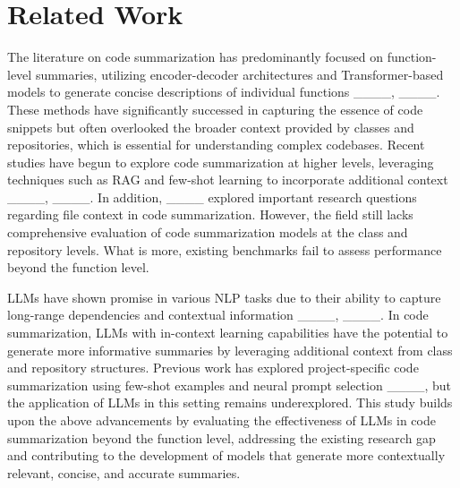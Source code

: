 \section{Related Work}
\vspace*{-1mm}

The literature on code summarization has predominantly focused on function-level summaries, utilizing encoder-decoder architectures and Transformer-based models to generate concise descriptions of individual functions ____, ____. These methods have significantly successed in capturing the essence of code snippets but often overlooked the broader context provided by classes and repositories, which is essential for understanding complex codebases. Recent studies have begun to explore code summarization at higher levels, leveraging techniques such as RAG and few-shot learning to incorporate additional context ____, ____. In addition, ____ explored important research questions regarding file context in code summarization. However, the field still lacks comprehensive evaluation of code summarization models at the class and repository levels. What is more, existing benchmarks fail to assess performance beyond the function level.

LLMs have shown promise in various NLP tasks due to their ability to capture long-range dependencies and contextual information ____, ____. In code summarization, LLMs with in-context learning capabilities have the potential to generate more informative summaries by leveraging additional context from class and repository structures. Previous work has explored project-specific code summarization using few-shot examples and neural prompt selection ____, but the application of LLMs in this setting remains underexplored. This study builds upon the above advancements by evaluating the effectiveness of LLMs in code summarization beyond the function level, addressing the existing research gap and contributing to the development of models that generate more contextually relevant, concise, and accurate summaries.

\vspace*{-1mm}